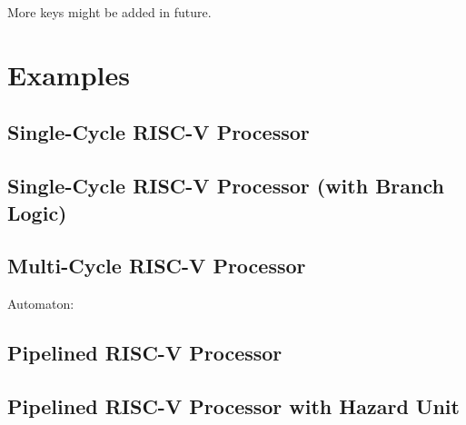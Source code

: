 \documentclass[10pt,a4paper]{scrartcl}
\begin{document}
\vspace{\baselineskip}
More keys might be added in future.

\newpage
\section{Examples}
\subsection{Single-Cycle RISC-V Processor}
\begin{center}
	\resizebox*{\textwidth}{!}{
		
	}
\end{center}


\subsection{Single-Cycle RISC-V Processor (with Branch Logic)}
\begin{center}
	\resizebox*{\textwidth}{!}{
		
	}
\end{center}


\subsection{Multi-Cycle RISC-V Processor}
\begin{center}
	\resizebox*{\textwidth}{!}{
		
	}
\end{center}
Automaton:
\begin{center}
	\resizebox*{\textwidth}{!}{
		
	}
\end{center}

\subsection{Pipelined RISC-V Processor}
\begin{center}
	\resizebox*{\textwidth}{!}{
		
	}
\end{center}

\subsection{Pipelined RISC-V Processor with Hazard Unit}
\begin{center}
	\resizebox*{\textwidth}{!}{
		
	}
\end{center}
\end{document}

